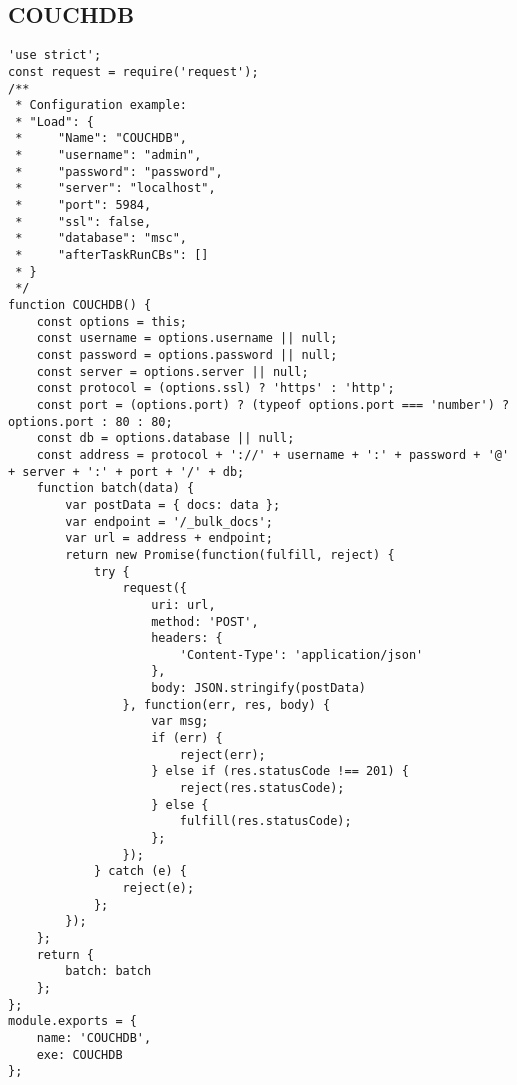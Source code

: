 \subsection{COUCHDB}
\label{netl-load-couchdb}
\begin{verbatim}
'use strict';
const request = require('request');
/**
 * Configuration example:
 * "Load": {
 *     "Name": "COUCHDB",
 *     "username": "admin",
 *     "password": "password",
 *     "server": "localhost",
 *     "port": 5984,
 *     "ssl": false,
 *     "database": "msc",
 *     "afterTaskRunCBs": []
 * }
 */
function COUCHDB() {
    const options = this;
    const username = options.username || null;
    const password = options.password || null;
    const server = options.server || null;
    const protocol = (options.ssl) ? 'https' : 'http';
    const port = (options.port) ? (typeof options.port === 'number') ? options.port : 80 : 80;
    const db = options.database || null;
    const address = protocol + '://' + username + ':' + password + '@' + server + ':' + port + '/' + db;
    function batch(data) {
        var postData = { docs: data };
        var endpoint = '/_bulk_docs';
        var url = address + endpoint;
        return new Promise(function(fulfill, reject) {
            try {
                request({
                    uri: url,
                    method: 'POST',
                    headers: {
                        'Content-Type': 'application/json'
                    },
                    body: JSON.stringify(postData)
                }, function(err, res, body) {
                    var msg;
                    if (err) {
                        reject(err);
                    } else if (res.statusCode !== 201) {
                        reject(res.statusCode);
                    } else {
                        fulfill(res.statusCode);
                    };
                });
            } catch (e) {
                reject(e);
            };
        });
    };
    return {
        batch: batch
    };
};
module.exports = {
    name: 'COUCHDB',
    exe: COUCHDB
};
\end{verbatim}


